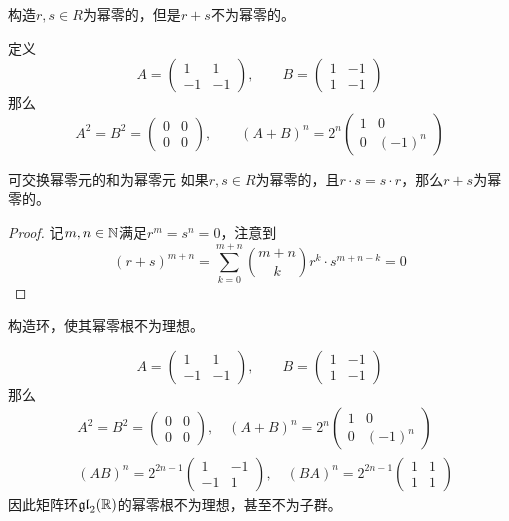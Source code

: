 \begin{problem}
	构造$r,s\in R$为幂零的，但是$r+s$不为幂零的。
\end{problem}

\begin{solution}
	定义
	$$
	A=\begin{pmatrix}1&1\\-1&-1\end{pmatrix},\qquad
	B=\begin{pmatrix}1&-1\\1&-1\end{pmatrix}
	$$
	那么
	$$
	A^2=B^2=\begin{pmatrix}0&0\\0&0\end{pmatrix},\qquad 
	(A+B)^n=2^n\begin{pmatrix}1&0\\0&(-1)^n\end{pmatrix}
	$$
\end{solution}

\begin{proposition}{}{可交换幂零元的和为幂零元}
	如果$r,s\in R$为幂零的，且$r\cdot s=s\cdot r$，那么$r+s$为幂零的。
\end{proposition}

\begin{proof}
	记$m,n\in\mathbb{N}$满足$r^m=s^n=0$，注意到
	$$
	(r+s)^{m+n}=\sum_{k=0}^{m+n}{m+n\choose k}r^{k}\cdot s^{m+n-k}=0
	$$
\end{proof}

\begin{problem}
	构造环，使其幂零根不为理想。
\end{problem}

\begin{solution}
	$$
	A=\begin{pmatrix}1&1\\-1&-1\end{pmatrix},\qquad
	B=\begin{pmatrix}1&-1\\1&-1\end{pmatrix}
	$$
	那么
	\begin{align*}
		&A^2=B^2=\begin{pmatrix}0&0\\0&0\end{pmatrix},\quad 
		(A+B)^n=2^n\begin{pmatrix}1&0\\0&(-1)^n\end{pmatrix}\\
		&(AB)^n=2^{2n-1}\begin{pmatrix}1&-1\\-1&1\end{pmatrix},\quad
		(BA)^n=2^{2n-1}\begin{pmatrix}1&1\\1&1\end{pmatrix}
	\end{align*}
	因此矩阵环$\mathfrak{gl}_2(\mathbb{R})$的幂零根不为理想，甚至不为子群。
\end{solution}

